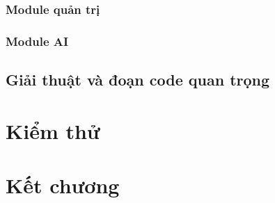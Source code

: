\subsubsection*{Module quản trị}

\subsubsection*{Module AI}
\label{sec:hienthucAI}

\subsection{Giải thuật và đoạn code quan trọng}
\label{sec:giaithuat}


\section{Kiểm thử}
\label{sec:ketquachucnang}

\section{Kết chương}
